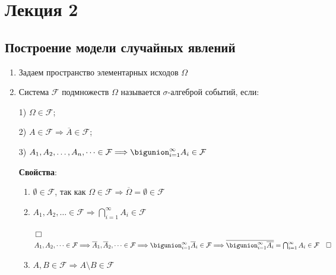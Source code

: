 \documentclass[12pt]{article}
\begin{document}

    \section{Лекция 2}
    
    \subsection{Построение модели случайных явлений}

    \hypertarget{axiomaticdefinitionofprobability}{}

    \begin{enumerate}
        \item Задаем пространство элементарных исходов $\Omega$

        \item \Defs Система $\mathcal{F}$ подмножеств $\Omega$ называется $\sigma$-алгеброй событий, если:

        1) $\Omega \in \mathcal{F}$;

        2) $A \in \mathcal{F} \Longrightarrow \overline{A} \in \mathcal{F}$;

        3) $A_1, A_2, \dots, A_n, \dots \in \mathcal{F} \Longrightarrow \bigunion_{i = 1}^\infty A_i \in \mathcal{F}$

        \textbf{Свойства}:

        \begin{enumerate}
            \item $\emptyset \in \mathcal{F}$, так как $\Omega \in \mathcal{F} \Longrightarrow \overline{\Omega} = \emptyset \in \mathcal{F}$

            \item $A_1, A_2, \dots \in \mathcal{F} \Longrightarrow \bigcap_{i = 1}^\infty A_i \in \mathcal{F}$

            \begin{tcolorbox}
                $\Box \quad$ $A_1, A_2, \dots \in \mathcal{F} \Longrightarrow
                \overline{A}_1, \overline{A}_2, \dots \in \mathcal{F} \Longrightarrow
                \bigunion_{i = 1}^\infty \overline{A}_i \in \mathcal{F} \Longrightarrow
                \overline{\bigunion_{i = 1}^\infty \overline{A_i}} = \bigcap_{i = 1}^\infty A_i \in \mathcal{F} \quad \Box$
            \end{tcolorbox}

            \item $A, B \in \mathcal{F} \Longrightarrow A \setminus B \in \mathcal{F}$


\end{enumerate}
\end{enumerate}
\end{document}
